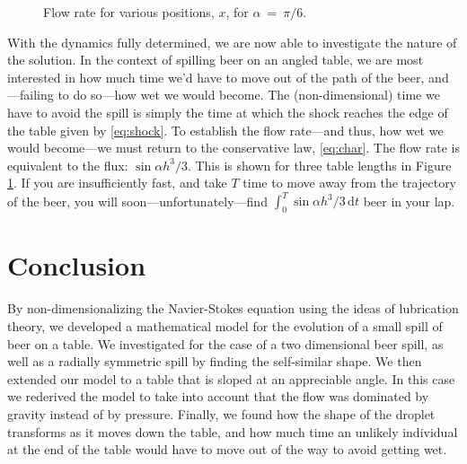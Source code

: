 \documentclass[11pt,a4paper,twocolumn]{article}
\let\originalleft\left
\let\originalright\right
\renewcommand{\left}{\mathopen{}\mathclose\bgroup\originalleft}
\renewcommand{\right}{\aftergroup\egroup\originalright}
\newcommand{\df}{\, \textrm{d}}
\begin{document}
\begin{figure}[tbp]
\centering
{}
\caption{Flow rate for various positions, $x$, for $\alpha~=~\pi / 6$.}
\label{fig:flow}
\end{figure}

With the dynamics fully determined, we are now able to investigate the nature of the solution. In the context of spilling beer on an angled table, we are most interested in how much time we'd have to move out of the path of the beer, and---failing to do so---how wet we would become. The (non-dimensional) time we have to avoid the spill is simply the time at which the shock reaches the edge of the table given by \eqref{eq:shock}. To establish the flow rate---and thus, how wet we would become---we must return to the conservative law, \eqref{eq:char}. The flow rate is equivalent to the flux: $\sin \alpha h^3 / 3$. This is shown for three table lengths in Figure \ref{fig:flow}. If you are insufficiently fast, and take $T$ time to move away from the trajectory of the beer, you will soon---unfortunately---find $\int_0^T \sin \alpha h^3 / 3 \df t$ beer in your lap.

\section{Conclusion}
By non-dimensionalizing the Navier-Stokes equation using the ideas of lubrication theory, we developed a mathematical model for the evolution of a small spill of beer on a table. We investigated for the case of a two dimensional beer spill, as well as a radially symmetric spill by finding the self-similar shape. We then extended our model to a table that is sloped at an appreciable angle. In this case we rederived the model to take into account that the flow was dominated by gravity instead of by pressure. Finally, we found how the shape of the droplet transforms as it moves down the table, and how much time an unlikely individual at the end of the table would have to move out of the way to avoid getting wet.


\end{document}
